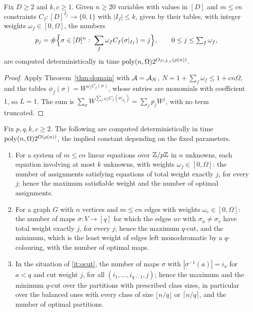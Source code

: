 \begin{theorem}\label{thm:domainprofile}
Fix $D\ge2$ and $k,c\ge1$. Given $n\ge20$ variables with values in $[D]$ and
$m\le cn$ constraints $C_f:[D]^{I_f}\to\{0,1\}$ with $|I_f|\le k$, given by
their tables, with integer weights $\omega_f\in[0,\Omega]$, the numbers
\[
  p_j=\#\Bigl\{\sigma\in[D]^n:\ \sum_f\omega_fC_f(\sigma|_{I_f})=j\Bigr\},\qquad
  0\le j\le\textstyle\sum_f\omega_f,
\]
are computed deterministically in time $\operatorname{poly}(n,\Omega)2^{O_{D,k,c}(\rho(n))}$.
\end{theorem}

\begin{proof}
Apply Theorem~\ref{thm:domain} with $\mathcal{A}=\mathcal{A}_N$, $N=1+\sum_f\omega_f\le 1+cn\Omega$,
and the tables $\phi_f(\sigma)=W^{\omega_fC_f(\sigma)}$, whose entries are
monomials with coefficient $1$, so $L=1$. The sum is
$\sum_\sigma W^{\sum_f\omega_fC_f(\sigma|_{I_f})}=\sum_jp_jW^{j}$, with no term
truncated.
\end{proof}

\begin{corollary}\label{cor:qcut}
Fix $p,q,k,c\ge2$. The following are computed deterministically in time
$\operatorname{poly}(n,\Omega)2^{O(\rho(n))}$, the implied constant depending on the fixed
parameters.
\begin{enumerate}[label=\textup{(\roman*)},leftmargin=2.2em]
\item\label{it:klin} For a system of $m\le cn$ linear equations over $\mathbb{Z}/p\mathbb{Z}$ in
$n$ unknowns, each equation involving at most $k$ unknowns, with weights
$\omega_f\in[0,\Omega]$: the number of assignments satisfying equations of total
weight exactly $j$, for every $j$; hence the maximum satisfiable weight and the
number of optimal assignments.
\item\label{it:qcut} For a graph $G$ with $n$ vertices and $m\le cn$ edges with
weights $\omega_e\in[0,\Omega]$: the number of maps $\sigma:V\to[q]$ for which
the edges $uv$ with $\sigma_u\ne\sigma_v$ have total weight exactly $j$, for
every $j$; hence the maximum $q$-cut, and the minimum, which is the least
weight of edges left monochromatic by a $q$-colouring, with the number of
optimal maps.
\item\label{it:balanced} In the situation of \ref{it:qcut}, the number of maps
$\sigma$ with $|\sigma^{-1}(a)|=i_a$ for $a<q$ and cut weight $j$, for all
$(i_1,\dots,i_{q-1},j)$; hence the maximum and the minimum $q$-cut over the
partitions with prescribed class sizes, in particular over the balanced ones
with every class of size $\lfloor n/q\rfloor$ or $\lceil n/q\rceil$, and the
number of optimal partitions.
\end{enumerate}
\end{corollary}

